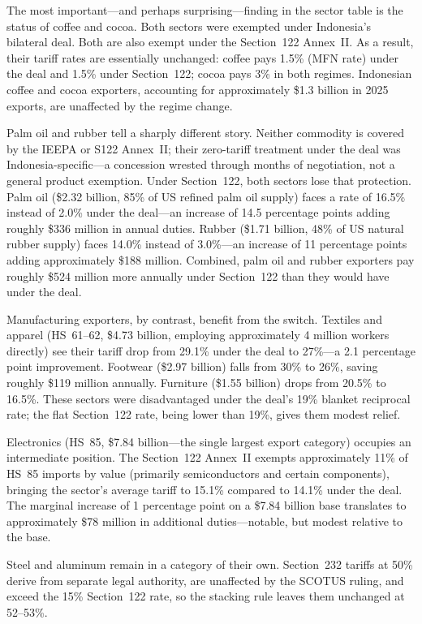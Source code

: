 \documentclass[12pt,a4paper]{article}
\begin{document}
The most important---and perhaps surprising---finding in the sector table is the status of coffee and cocoa. Both sectors were exempted under Indonesia's bilateral deal. Both are also exempt under the Section~122 Annex~II. As a result, their tariff rates are essentially unchanged: coffee pays 1.5\% (MFN rate) under the deal and 1.5\% under Section~122; cocoa pays 3\% in both regimes. Indonesian coffee and cocoa exporters, accounting for approximately \$1.3 billion in 2025 exports, are unaffected by the regime change.

Palm oil and rubber tell a sharply different story. Neither commodity is covered by the IEEPA or S122 Annex~II; their zero-tariff treatment under the deal was Indonesia-specific---a concession wrested through months of negotiation, not a general product exemption. Under Section~122, both sectors lose that protection. Palm oil (\$2.32 billion, 85\% of US refined palm oil supply) faces a rate of 16.5\% instead of 2.0\% under the deal---an increase of 14.5 percentage points adding roughly \$336 million in annual duties. Rubber (\$1.71 billion, 48\% of US natural rubber supply) faces 14.0\% instead of 3.0\%---an increase of 11 percentage points adding approximately \$188 million. Combined, palm oil and rubber exporters pay roughly \$524 million more annually under Section~122 than they would have under the deal.

Manufacturing exporters, by contrast, benefit from the switch. Textiles and apparel (HS~61--62, \$4.73 billion, employing approximately 4 million workers directly) see their tariff drop from 29.1\% under the deal to 27\%---a 2.1 percentage point improvement. Footwear (\$2.97 billion) falls from 30\% to 26\%, saving roughly \$119 million annually. Furniture (\$1.55 billion) drops from 20.5\% to 16.5\%. These sectors were disadvantaged under the deal's 19\% blanket reciprocal rate; the flat Section~122 rate, being lower than 19\%, gives them modest relief.

Electronics (HS~85, \$7.84 billion---the single largest export category) occupies an intermediate position. The Section~122 Annex~II exempts approximately 11\% of HS~85 imports by value (primarily semiconductors and certain components), bringing the sector's average tariff to 15.1\% compared to 14.1\% under the deal. The marginal increase of 1 percentage point on a \$7.84 billion base translates to approximately \$78 million in additional duties---notable, but modest relative to the base.

Steel and aluminum remain in a category of their own. Section~232 tariffs at 50\% derive from separate legal authority, are unaffected by the SCOTUS ruling, and exceed the 15\% Section~122 rate, so the stacking rule leaves them unchanged at 52--53\%.
\end{document}
